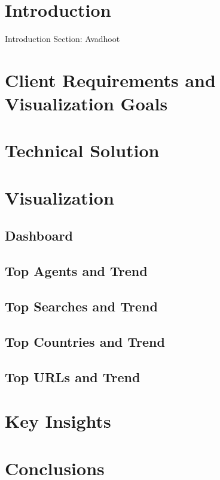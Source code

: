 \section{Introduction}

Introduction Section: Avadhoot

\section{Client Requirements and Visualization Goals}


\section{Technical Solution}


\section{Visualization}

\subsection{Dashboard}

\subsection{Top Agents and Trend}

\subsection{Top Searches and Trend}

\subsection{Top Countries and Trend}

\subsection{Top URLs and Trend}


\section{Key Insights}


\section{Conclusions}





\appendix


\begin{acks}

\end{acks}
